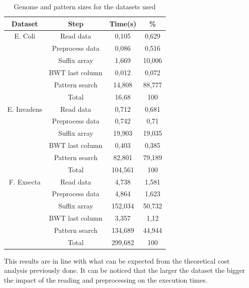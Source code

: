 \documentclass[final,5p,times,twocolumn,authoryear]{elsarticle}
\begin{document}
\begin{table}[H]
\begin{center}
\begin{tabular}{|| c c c c ||}
\hline
Dataset & Step & Time(s) & \% \\
\hline
E. Coli & Read data & 0,105 & 0,629 \\
   & Preprocess data & 0,086 & 0,516 \\
   & Suffix array & 1,669 & 10,006 \\
   & BWT last column & 0,012 & 0,072 \\
   & Pattern search & 14,808 & 88,777 \\
   & Total & 16,68 & 100 \\
\hline
E. Invadens & Read data & 0,712 & 0,681 \\
   & Preprocess data & 0,742 & 0,71 \\
   & Suffix array & 19,903 & 19,035 \\
   & BWT last column & 0,403 & 0,385 \\
   & Pattern search & 82,801 & 79,189 \\
   & Total & 104,561 & 100 \\
\hline
F. Exsecta & Read data & 4,738 & 1,581 \\
   & Preprocess data & 4,864 & 1,623 \\
   & Suffix array & 152,034 & 50,732 \\
   & BWT last column & 3,357 & 1,12 \\
   & Pattern search & 134,689 & 44,944 \\
   & Total & 299,682 & 100 \\
\hline
\end{tabular}
\end{center}
\caption{Genome and pattern sizes for the datasets used}
\vspace{-2mm}%
\label{table:times_table}
\end{table}
This results are in line with what can be expected from the theoretical cost analysis previously done. It can be noticed that the larger the dataset the bigger the impact of the reading and preprocessing on the execution times.
\end{document}
